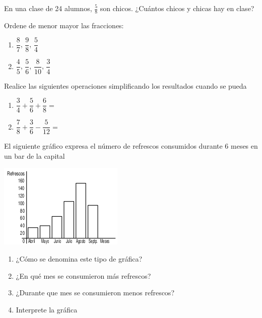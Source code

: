 \documentclass[letterpaper,fleqn]{article}
\begin{document}
\begin{enumerate}
\begin{minipage}{.35\textwidth}
\end{minipage}
\item En una clase de 24 alumnos, $\frac{5}{8}$ son chicos. ¿Cuántos chicos y chicas hay en clase?\noanswer
\item Ordene de menor  mayor las fracciones:
\begin{enumerate}
\item $\dfrac{8}{7}$, $\dfrac{9}{8}$, $\dfrac{5}{4}$\noanswer[20pt]
\item $\dfrac{4}{5}$, $\dfrac{5}{6}$, $\dfrac{8}{10}$, $\dfrac{3}{4}$\noanswer[20pt]
\end{enumerate}
\item Realice las siguientes operaciones simplificando los resultados cuando se pueda
\begin{enumerate}
\item $\dfrac{3}{4}+\dfrac{5}{6}+\dfrac{6}{8}=$\noanswer[20pt]
\item $\dfrac{7}{8}+\dfrac{3}{6}-\dfrac{5}{12}=$\noanswer[20pt]
\end{enumerate}
\begin{minipage}{.45\textwidth}
\item El siguiente gr\'{a}fico expresa el n\'{u}mero de refrescos consumidos durante 6 meses en un bar de la capital
\end{minipage} \hfill
\begin{minipage}{.55\textwidth}
\includegraphics[scale=1]{Images/barras.png} 
\end{minipage}
\begin{enumerate}
\item ¿Cómo se denomina este tipo de gráfica?
\item ¿En qué mes se consumieron más refrescos?
\item ¿Durante que mes se consumieron menos refrescos?
\item Interprete la gráfica
\end{enumerate}
 \end{enumerate}
\end{document}
